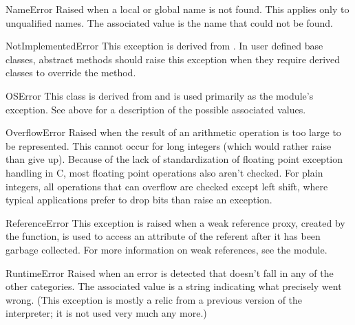 \begin{excdesc}{NameError}
  Raised when a local or global name is not found.  This applies only
  to unqualified names.  The associated value is the name that could
  not be found.
\end{excdesc}

\begin{excdesc}{NotImplementedError}
  This exception is derived from .  In user
  defined base classes, abstract methods should raise this exception
  when they require derived classes to override the method.
\end{excdesc}

\begin{excdesc}{OSError}
  This class is derived from  and is used
  primarily as the  module's  exception.
  See  above for a description of the
  possible associated values.
\end{excdesc}

\begin{excdesc}{OverflowError}
  Raised when the result of an arithmetic operation is too large to be
  represented.  This cannot occur for long integers (which would rather
  raise  than give up).  Because of the lack of
  standardization of floating point exception handling in C, most
  floating point operations also aren't checked.  For plain integers,
  all operations that can overflow are checked except left shift, where
  typical applications prefer to drop bits than raise an exception.
\end{excdesc}

\begin{excdesc}{ReferenceError}
  This exception is raised when a weak reference proxy, created by the
   function, is used to access
  an attribute of the referent after it has been garbage collected.
  For more information on weak references, see the 
  module.
\end{excdesc}

\begin{excdesc}{RuntimeError}
  Raised when an error is detected that doesn't fall in any of the
  other categories.  The associated value is a string indicating what
  precisely went wrong.  (This exception is mostly a relic from a
  previous version of the interpreter; it is not used very much any
  more.)
\end{excdesc}

